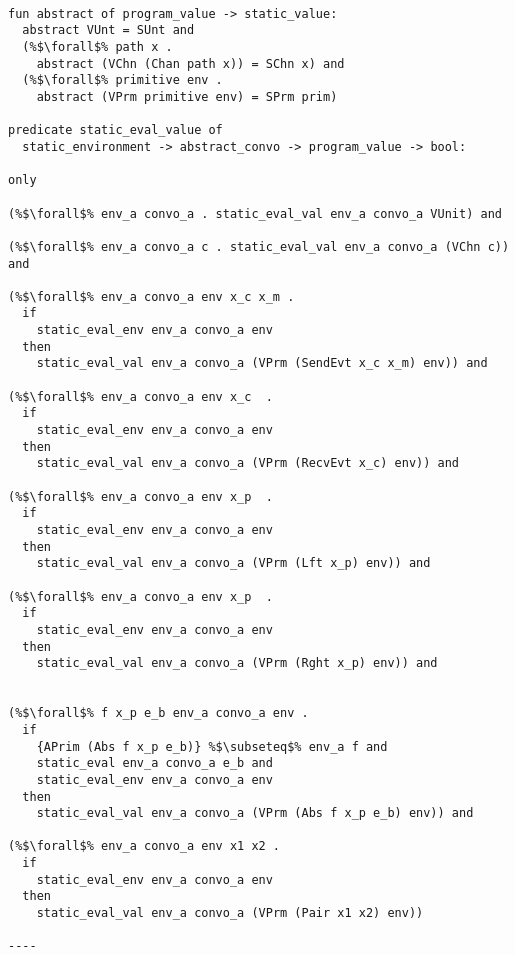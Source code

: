 \documentclass{article}
\begin{document}
\begin{lstlisting}[language=logic, style=codestyle1, escapechar=\%]

fun abstract of program_value -> static_value:
  abstract VUnt = SUnt and 
  (%$\forall$% path x . 
    abstract (VChn (Chan path x)) = SChn x) and
  (%$\forall$% primitive env .
    abstract (VPrm primitive env) = SPrm prim)

predicate static_eval_value of
  static_environment -> abstract_convo -> program_value -> bool: 

only

(%$\forall$% env_a convo_a . static_eval_val env_a convo_a VUnit) and

(%$\forall$% env_a convo_a c . static_eval_val env_a convo_a (VChn c)) and

(%$\forall$% env_a convo_a env x_c x_m .
  if
    static_eval_env env_a convo_a env
  then
    static_eval_val env_a convo_a (VPrm (SendEvt x_c x_m) env)) and

(%$\forall$% env_a convo_a env x_c  .
  if
    static_eval_env env_a convo_a env
  then
    static_eval_val env_a convo_a (VPrm (RecvEvt x_c) env)) and

(%$\forall$% env_a convo_a env x_p  .
  if
    static_eval_env env_a convo_a env
  then
    static_eval_val env_a convo_a (VPrm (Lft x_p) env)) and

(%$\forall$% env_a convo_a env x_p  .
  if
    static_eval_env env_a convo_a env
  then
    static_eval_val env_a convo_a (VPrm (Rght x_p) env)) and


(%$\forall$% f x_p e_b env_a convo_a env .
  if
    {APrim (Abs f x_p e_b)} %$\subseteq$% env_a f and 
    static_eval env_a convo_a e_b and 
    static_eval_env env_a convo_a env
  then
    static_eval_val env_a convo_a (VPrm (Abs f x_p e_b) env)) and

(%$\forall$% env_a convo_a env x1 x2 .
  if
    static_eval_env env_a convo_a env
  then
    static_eval_val env_a convo_a (VPrm (Pair x1 x2) env))

----

\end{lstlisting}
\end{document}
